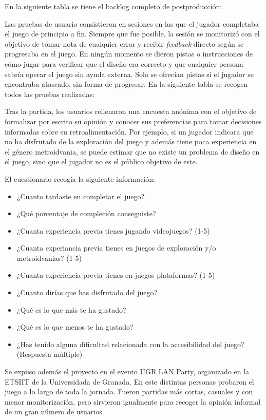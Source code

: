 En la siguiente tabla se tiene el backlog completo de postproducción:


Las pruebas de usuario consistieron en sesiones en las que el jugador completaba el juego de principio a fin. Siempre que fue posible, la sesión se monitorizó con el objetivo de tomar nota de cualquier error y recibir \textit{feedback} directo según se progresaba en el juego. En ningún momento se dieron pistas o instrucciones de cómo jugar para verificar que el diseño era correcto y que cualquier persona sabría operar el juego sin ayuda externa. Solo se ofrecían pistas si el jugador se encontraba atascado, sin forma de progresar. En la siguiente tabla se recogen todos las pruebas realizadas:


Tras la partida, los usuarios rellenaron una encuesta anónima con el objetivo de formalizar por escrito su opinión y conocer sus preferencias para tomar decisiones informadas sobre su retroalimentación. Por ejemplo, si un jugador indicara que no ha disfrutado de la exploración del juego y además tiene poca experiencia en el género metroidvania, se puede estimar que no existe un problema de diseño en el juego, sino que el jugador no es el público objetivo de este.

El cuestionario recogía la siguiente información:

\begin{itemize}
    \item ¿Cuanto tardaste en completar el juego?
    \item ¿Qué porcentaje de compleción conseguiste?
    \item ¿Cuanta experiencia previa tienes jugando videojuegos? (1-5)
    \item ¿Cuanta experiancia previa tienes en juegos de exploración y/o metroidvanias? (1-5)
    \item ¿Cuanta experiencia previa tienes en juegos plataformas? (1-5)
    \item ¿Cuanto dirías que has disfrutado del juego?
    \item ¿Qué es lo que más te ha gustado?
    \item ¿Qué es lo que menos te ha gustado?
    \item ¿Has tenido alguna dificultad relacionada con la accesibilidad del juego? (Respuesta múltiple)
\end{itemize}

Se expuso además el proyecto en el evento UGR LAN Party, organizado en la ETSIIT de la Universidada de Granada. En este distintas personas probaron el juego a lo largo de toda la jornada. Fueron partidas más cortas, casuales y con menor monitorización, pero sirvieron igualmente para recoger la opinión informal de un gran número de usuarios.

